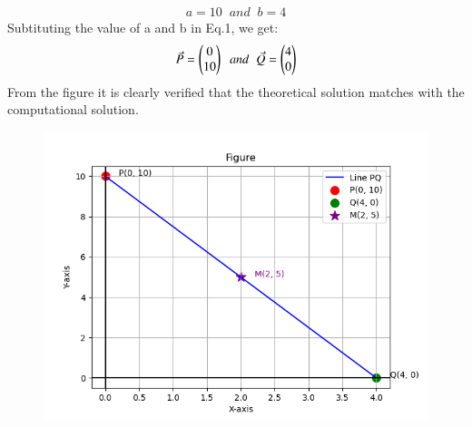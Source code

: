 \documentclass[journal]{IEEEtran}
\theoremstyle{remark}
\begin{document}
\begin{align}
    a=10\;\;and\;\;b=4
\end{align}
Subtituting the value of a and b in Eq.1, we get:
\begin{align}
    \Vec{P}=\begin{pmatrix}0\\10\end{pmatrix}\;\;and\;\;\Vec{Q}=\begin{pmatrix}4\\0\end{pmatrix}
\end{align}
From the figure it is clearly verified that the theoretical solution matches with the computational solution.\\
\begin{figure}[h]
    \centering
    \includegraphics[height=0.5\textheight, keepaspectratio]{figs/figure1.png}
    \label{figure_1}
\end{figure}
\end{document}
